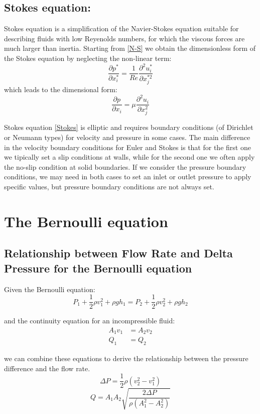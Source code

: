 \documentclass{article}
\begin{document}
\subsection{Stokes equation:}
Stokes equation is a simplification of the Navier-Stokes equation suitable for describing fluids with low Reyenolds numbers, for which the viscous forces are much larger than inertia.
Starting from \eqref{N-S} we obtain the dimensionless form of the Stokes equation by neglecting the non-linear term:
\[
    \frac{\partial p^*}{\partial x_i^*} = \frac{1}{Re} \frac{\partial^2 u_i^*}{\partial x_j^{*2}}
\]
which leads to the dimensional form:
\begin{equation}
    \frac{\partial p}{\partial x_i} = \mu \frac{\partial^2 u_i}{\partial x_j^2} \label{Stokes}
\end{equation}

Stokes equation \eqref{Stokes} is elliptic and requires boundary conditions (of Dirichlet or Neumann types) for velocity and pressure in some cases.
The main difference in the velocity boundary conditions for Euler and Stokes is that for the first one we tipically set a slip conditions at walls, while for the second one we often apply the no-slip condition at solid boundaries.
If we consider the pressure boundary conditions, we may need in both cases to set an inlet or outlet pressure to apply specific values, but pressure boundary conditions are not always set.

\section{The Bernoulli equation}
\subsection{Relationship between Flow Rate and Delta Pressure for the Bernoulli equation}
Given the Bernoulli equation:
\begin{equation}
P_1 + \frac{1}{2} \rho v_1^2 + \rho gh_1 = P_2 + \frac{1}{2} \rho v_2^2 + \rho gh_2
\end{equation}

and the continuity equation for an incompressible fluid:
\begin{align}
    A_1 v_1 &= A_2 v_2 \\
    Q_1 &= Q_2
\end{align}

we can combine these equations to derive the relationship between the pressure difference and the flow rate.
\begin{equation}
\Delta P = \frac{1}{2} \rho \left( v_2^2 - v_1^2 \right)
\end{equation}
\begin{equation}
Q = A_1 A_2\sqrt{\frac{2 \Delta P}{\rho \left( A_1^2 - A_2^2 \right)}}
\end{equation}
\end{document}
